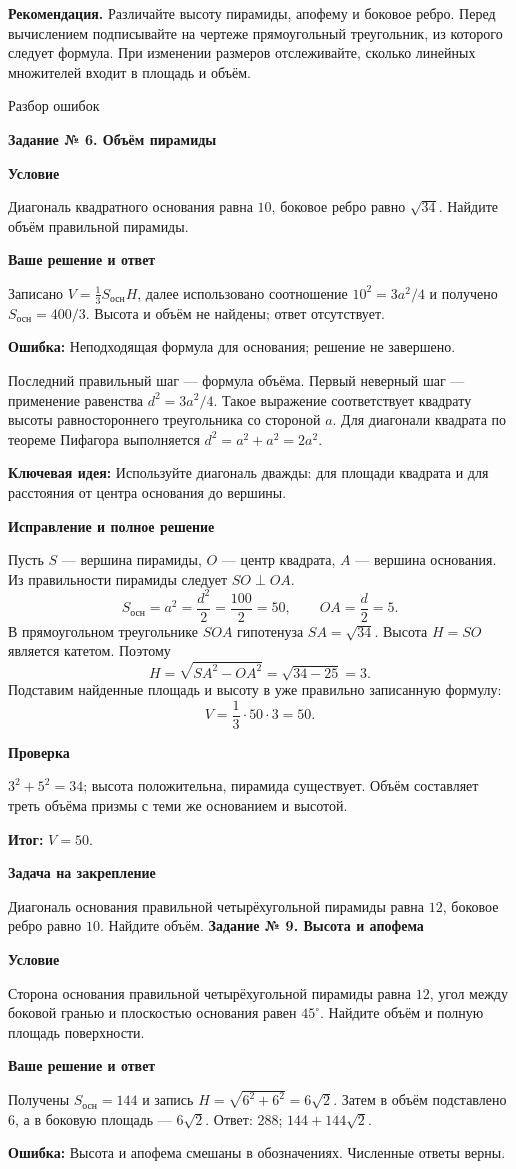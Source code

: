 \documentclass[a4paper,12pt]{article}
\newcommand{\sub}[1]{\par\smallskip\textbf{\color{darkaccent}#1}\par}
\newcommand{\err}[1]{\par\textcolor{red!70!black}{\textbf{Ошибка:}} #1\par}
\newcommand{\idea}[1]{\par\textcolor{blue!60!black}{\textbf{Ключевая идея:}} #1\par}
\newcommand{\result}[1]{\par\textcolor{teal!60!black}{\textbf{Итог:}} #1\par}
\newcommand{\task}[2]{\clearpage\phantomsection\label{task:#1}{\Large\color{darkaccent}\bfseries Задание № #1. #2}\par\smallskip{\color{accent}\rule{\linewidth}{0.45pt}}\par}
\begin{document}
\vspace{12mm}
\textbf{Рекомендация.} Различайте высоту пирамиды, апофему и боковое ребро. Перед вычислением подписывайте на чертеже прямоугольный треугольник, из которого следует формула. При изменении размеров отслеживайте, сколько линейных множителей входит в площадь и объём.
\clearpage
\thispagestyle{empty}
\vspace*{\fill}
\begin{center}{\Huge\color{darkaccent} Разбор ошибок}\end{center}
\vspace*{\fill}
\task{6}{Объём пирамиды}
\sub{Условие} Диагональ квадратного основания равна $10$, боковое ребро равно $\sqrt{34}$. Найдите объём правильной пирамиды.
\sub{Ваше решение и ответ} Записано $V=\frac13 S_{\text{осн}}H$, далее использовано соотношение $10^2=3a^2/4$ и получено $S_{\text{осн}}=400/3$. Высота и объём не найдены; ответ отсутствует.
\err{Неподходящая формула для основания; решение не завершено.}
Последний правильный шаг --- формула объёма. Первый неверный шаг --- применение равенства $d^2=3a^2/4$. Такое выражение соответствует квадрату высоты равностороннего треугольника со стороной $a$. Для диагонали квадрата по теореме Пифагора выполняется $d^2=a^2+a^2=2a^2$.
\idea{Используйте диагональ дважды: для площади квадрата и для расстояния от центра основания до вершины.}
\sub{Исправление и полное решение}
Пусть $S$ --- вершина пирамиды, $O$ --- центр квадрата, $A$ --- вершина основания. Из правильности пирамиды следует $SO\perp OA$.
\[
S_{\text{осн}}=a^2=\frac{d^2}{2}=\frac{100}{2}=50,
\qquad OA=\frac d2=5.
\]
В прямоугольном треугольнике $SOA$ гипотенуза $SA=\sqrt{34}$. Высота $H=SO$ является катетом. Поэтому
\[
H=\sqrt{SA^2-OA^2}=\sqrt{34-25}=3.
\]
Подставим найденные площадь и высоту в уже правильно записанную формулу:
\[V=\frac13\cdot50\cdot3=50.\]
\sub{Проверка} $3^2+5^2=34$; высота положительна, пирамида существует. Объём составляет треть объёма призмы с теми же основанием и высотой.
\result{$V=50$.}
\sub{Задача на закрепление} Диагональ основания правильной четырёхугольной пирамиды равна $12$, боковое ребро равно $10$. Найдите объём.
\task{9}{Высота и апофема}
\sub{Условие} Сторона основания правильной четырёхугольной пирамиды равна $12$, угол между боковой гранью и плоскостью основания равен $45^\circ$. Найдите объём и полную площадь поверхности.
\sub{Ваше решение и ответ} Получены $S_{\text{осн}}=144$ и запись $H=\sqrt{6^2+6^2}=6\sqrt2$. Затем в объём подставлено $6$, а в боковую площадь --- $6\sqrt2$. Ответ: $288$; $144+144\sqrt2$.
\err{Высота и апофема смешаны в обозначениях. Численные ответы верны.}
\end{document}
